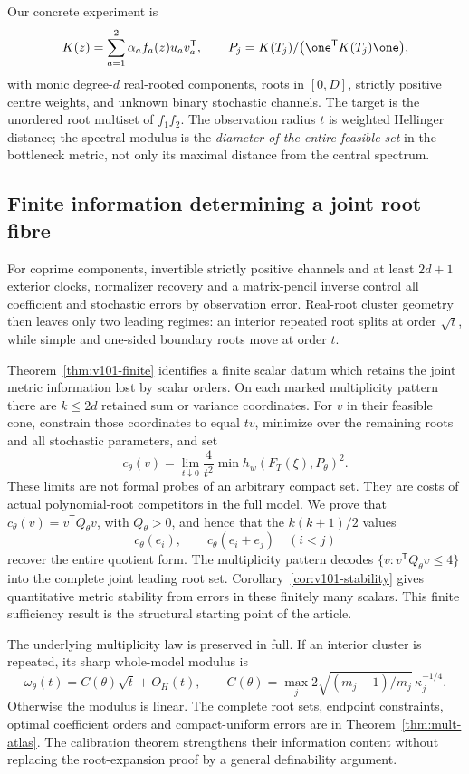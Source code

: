 Our concrete experiment is
\[
 K(z)=\sum_{a=1}^2\alpha_a f_a(z)u_av_a^{\mathsf T},\qquad
 P_j=K(T_j)/\bigl(\one^{\mathsf T}K(T_j)\one\bigr),
\]
with monic degree-$d$ real-rooted components, roots in $[0,D]$, strictly
positive centre weights, and unknown binary stochastic channels. The
target is the unordered root multiset of $f_1f_2$. The observation
radius $t$ is weighted Hellinger distance; the spectral modulus is the
\emph{diameter of the entire feasible set} in the bottleneck metric,
not only its maximal distance from the central spectrum.

\subsection*{Finite information determining a joint root fibre}
For coprime components, invertible strictly positive channels and at
least $2d+1$ exterior clocks, normalizer recovery and a matrix-pencil
inverse control all coefficient and stochastic errors by observation
error. Real-root cluster geometry then leaves only two leading regimes:
an interior repeated root splits at order $\sqrt t$, while simple and
one-sided boundary roots move at order $t$.

Theorem~\ref{thm:v101-finite} identifies a finite scalar datum which
retains the joint metric information lost by scalar orders. On each
marked multiplicity pattern there are $k\le2d$ retained sum or
variance coordinates. For $v$ in their feasible cone, constrain those
coordinates to equal $tv$, minimize over the remaining roots and all
stochastic parameters, and set
\[
 c_\theta(v)=\lim_{t\downarrow0}\frac4{t^2}
      \min h_w(F_T(\xi),P_\theta)^2.
\]
These limits are not formal probes of an arbitrary compact set. They
are costs of actual polynomial-root competitors in the full model.
We prove that $c_\theta(v)=v^{\mathsf T}Q_\theta v$, with
$Q_\theta>0$, and hence that the $k(k+1)/2$ values
\[
 c_\theta(e_i),\qquad c_\theta(e_i+e_j)\quad(i<j)
\]
recover the entire quotient form. The multiplicity pattern decodes
$\{v:v^{\mathsf T}Q_\theta v\le4\}$ into the complete joint leading
root set. Corollary~\ref{cor:v101-stability} gives quantitative metric
stability from errors in these finitely many scalars. This finite
sufficiency result is the structural starting point of the article.

The underlying multiplicity law is preserved in full. If an interior
cluster is repeated, its sharp whole-model modulus is
\[
 \omega_\theta(t)=C(\theta)\sqrt t+O_H(t),\qquad
 C(\theta)=\max_j2\sqrt{(m_j-1)/m_j}\,\kappa_j^{-1/4}.
\]
Otherwise the modulus is linear. The complete root sets, endpoint
constraints, optimal coefficient orders and compact-uniform errors are
in Theorem~\ref{thm:mult-atlas}. The calibration theorem strengthens
their information content without replacing the root-expansion proof
by a general definability argument.

